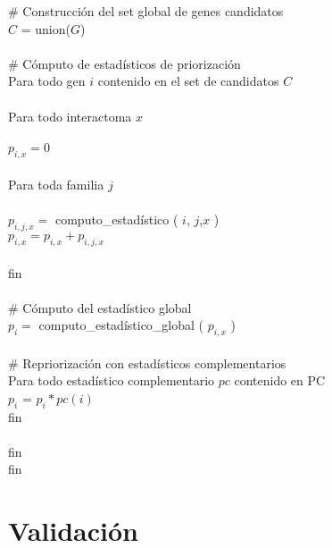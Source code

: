 \noindent \# Construcción del set global de genes candidatos
\\
$C$ = union($G$) \\
\\
\# Cómputo de estadísticos de priorización \\
Para todo gen $i$ contenido en el set de candidatos $C$ \\
\\
\hspace*{1cm} Para todo interactoma $x$ \\
	\\
	\hspace*{2cm} $p_{i,x} = 0$ \\
	\\
	\hspace*{2cm} Para toda familia $j$ \\
		\\
		\hspace*{3cm} $p_{i,j,x}=$ computo\_estadístico ( $i$, $j$,$x$ ) \\
		\hspace*{3cm} $p_{i,x} = p_{i,x} + p_{i,j,x}$ \\
		\\
	\hspace*{2cm} fin \\
	\\
	\hspace*{2cm} \# Cómputo del estadístico global \\
	\hspace*{2cm} $p_i=$ computo\_estadístico\_global ( $p_{i,x}$ ) \\
	\\
	\hspace*{2cm} \# Repriorización con estadísticos complementarios \\
	\hspace*{2cm} Para todo estadístico complementario $pc$ contenido en PC
		\\
		\hspace*{3cm} $p_i$ = $p_i * pc(i)$
		\\
	\hspace*{2cm} fin \\
	\\
\hspace*{1cm} fin \\
fin

\bigskip




\section{Validación}

